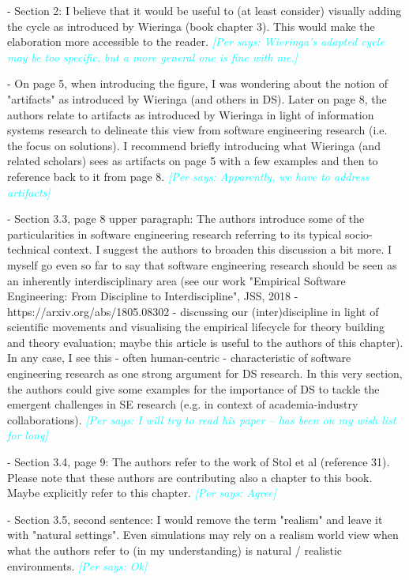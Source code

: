 \documentclass{article}
\newcommand{\per}[1]{\textcolor{cyan}{{\it [Per says: #1]}}}
\newcommand{\per}[1]{}
\begin{document}
- Section 2: I believe that it would be useful to (at least consider) visually adding the cycle as introduced by Wieringa (book chapter 3). This would make the elaboration more accessible to the reader. \per{Wieringa's adapted cycle may be too specific, but a more general one is fine with me.}

- On page 5, when introducing the figure, I was wondering about the notion of "artifacts" as introduced by Wieringa (and others in DS). Later on page 8, the authors relate to artifacts as introduced by Wieringa in light of information systems research to delineate this view from software engineering research (i.e. the focus on solutions). I recommend briefly introducing what Wieringa (and related scholars) sees as artifacts on page 5 with a few examples and then to reference back to it from page 8. \per{Apparently, we have to address artifacts}

- Section 3.3, page 8 upper paragraph: The authors introduce some of the particularities in software engineering research referring to its typical socio-technical context. I suggest the authors to broaden this discussion a bit more. I myself go even so far to say that software engineering research should be seen as an inherently interdisciplinary area (see our work "Empirical Software Engineering: From Discipline to Interdiscipline", JSS, 2018 - https://arxiv.org/abs/1805.08302 - discussing our (inter)discipline in light of scientific movements and visualising the empirical lifecycle for theory building and theory evaluation; maybe this article is useful to the authors of this chapter). In any case, I see this - often human-centric - characteristic of software engineering research as one strong argument for DS research. In this very section, the authors could give some examples for the importance of DS to tackle the emergent challenges in SE research (e.g. in context of academia-industry collaborations). \per{I will try to read his paper -- has been on my wish list for long}

- Section 3.4, page 9: The authors refer to the work of Stol et al (reference 31). Please note that these authors are contributing also a chapter to this book. Maybe explicitly refer to this chapter. \per{Agree}

- Section 3.5, second sentence: I would remove the term "realism" and leave it with "natural settings". Even simulations may rely on a realism world view when what the authors refer to (in my understanding) is natural / realistic environments. \per{Ok}
\end{document}
